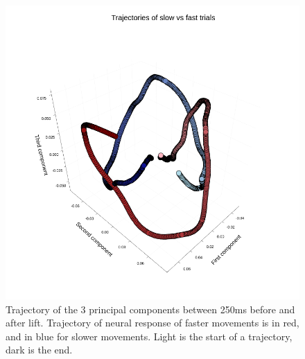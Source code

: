 \begin{figure}[h!]
	\centering
	\includegraphics[scale=0.4]{../../plots/pca-speed.png}
	\caption{Trajectory of the 3 principal components between 250ms before and after lift. Trajectory of neural response of faster movements is in red, and in blue for slower movements. Light is the start of a trajectory, dark is the end.}
	\label{fig:pca-speed}
\end{figure}


